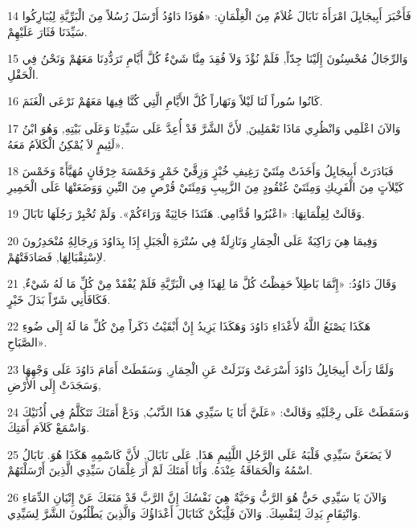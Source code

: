 \par 14 فَأَخْبَرَ أَبِيجَايِلَ امْرَأَةَ نَابَالَ غُلاَمٌ مِنَ الْغِلْمَانِ: «هُوَذَا دَاوُدُ أَرْسَلَ رُسُلاً مِنَ الْبَرِّيَّةِ لِيُبَارِكُوا سَيِّدَنَا فَثَارَ عَلَيْهِمْ.
\par 15 وَالرِّجَالُ مُحْسِنُونَ إِلَيْنَا جِدّاً, فَلَمْ نُؤْذَ وَلاَ فُقِدَ مِنَّا شَيْءٌ كُلَّ أَيَّامِ تَرَدُّدِنَا مَعَهُمْ وَنَحْنُ فِي الْحَقْلِ.
\par 16 كَانُوا سُوراً لَنَا لَيْلاً وَنَهَاراً كُلَّ الأَيَّامِ الَّتِي كُنَّا فِيهَا مَعَهُمْ نَرْعَى الْغَنَمَ.
\par 17 وَالآنَ اعْلَمِي وَانْظُرِي مَاذَا تَعْمَلِينَ, لأَنَّ الشَّرَّ قَدْ أُعِدَّ عَلَى سَيِّدِنَا وَعَلَى بَيْتِهِ, وَهُوَ ابْنُ لَئِيمٍ لاَ يُمْكِنُ الْكَلاَمُ مَعَهُ».
\par 18 فَبَادَرَتْ أَبِيجَايِلُ وَأَخَذَتْ مِئَتَيْ رَغِيفِ خُبْزٍ وَزِقَّيْ خَمْرٍ وَخَمْسَةَ خِرْفَانٍ مُهَيَّأَةً وَخَمْسَ كَيْلاَتٍ مِنَ الْفَرِيكِ وَمِئَتَيْ عُنْقُودٍ مِنَ الزَّبِيبِ وَمِئَتَيْ قُرْصٍ مِنَ التِّينِ وَوَضَعَتْهَا عَلَى الْحَمِيرِ
\par 19 وَقَالَتْ لِغِلْمَانِهَا: «اعْبُرُوا قُدَّامِي. هَئَنَذَا جَائِيَةٌ وَرَاءَكُمْ». وَلَمْ تُخْبِرْ رَجُلَهَا نَابَالَ.
\par 20 وَفِيمَا هِيَ رَاكِبَةٌ عَلَى الْحِمَارِ وَنَازِلَةٌ فِي سُتْرَةِ الْجَبَلِ إِذَا بِدَاوُدَ وَرِجَالِهُِ مُنْحَدِرُونَ لاِسْتِقْبَالِهَا, فَصَادَفَتْهُمْ.
\par 21 وَقَالَ دَاوُدُ: «إِنَّمَا بَاطِلاً حَفِظْتُ كُلَّ مَا لِهَذَا فِي الْبَرِّيَّةِ فَلَمْ يُفْقَدْ مِنْ كُلِّ مَا لَهُ شَيْءٌ, فَكَافَأَنِي شَرّاً بَدَلَ خَيْرٍ.
\par 22 هَكَذَا يَصْنَعُ اللَّهُ لأَعْدَاءِ دَاوُدَ وَهَكَذَا يَزِيدُ إِنْ أَبْقَيْتُ ذَكَراً مِنْ كُلِّ مَا لَهُ إِلَى ضُوءِ الصَّبَاحِ».
\par 23 وَلَمَّا رَأَتْ أَبِيجَايِلُ دَاوُدَ أَسْرَعَتْ وَنَزَلَتْ عَنِ الْحِمَارِ, وَسَقَطَتْ أَمَامَ دَاوُدَ عَلَى وَجْهِهَا وَسَجَدَتْ إِلَى الأَرْضِ,
\par 24 وَسَقَطَتْ عَلَى رِجْلَيْهِ وَقَالَتْ: «عَلَيَّ أَنَا يَا سَيِّدِي هَذَا الذَّنْبُ, وَدَعْ أَمَتَكَ تَتَكَلَّمُ فِي أُذُنَيْكَ وَاسْمَعْ كَلاَمَ أَمَتِكَ.
\par 25 لاَ يَضَعَنَّ سَيِّدِي قَلْبَهُ عَلَى الرَّجُلِ اللَّئِيمِ هَذَا, عَلَى نَابَالَ, لأَنَّ كَاسْمِهِ هَكَذَا هُوَ. نَابَالُ اسْمُهُ وَالْحَمَاقَةُ عِنْدَهُ. وَأَنَا أَمَتَكَ لَمْ أَرَ غِلْمَانَ سَيِّدِي الَّذِينَ أَرْسَلْتَهُمْ.
\par 26 وَالآنَ يَا سَيِّدِي حَيٌّ هُوَ الرَّبُّ وَحَيَّةٌ هِيَ نَفْسُكَ إِنَّ الرَّبَّ قَدْ مَنَعَكَ عَنْ إِتْيَانِ الدِّمَاءِ وَانْتِقَامِ يَدِكَ لِنَفْسِكَ. وَالآنَ فَلِْيَكُنْ كَنَابَالَ أَعْدَاؤُكَ وَالَّذِينَ يَطْلُبُونَ الشَّرَّ لِسَيِّدِي.
